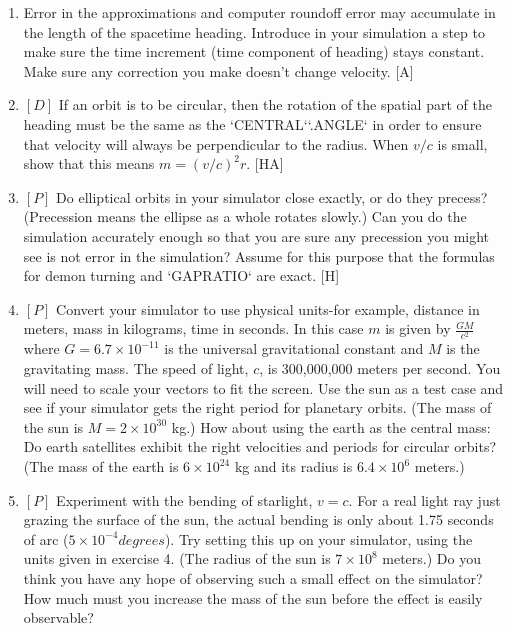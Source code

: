 \documentclass{book}
\begin{document}
\begin{enumerate}
\item Error in the approximations and computer roundoff error may accumulate in the length of the spacetime heading. Introduce in your
simulation a step to make sure the time increment (time component of
heading) stays constant. Make sure any correction you make doesn't
change velocity. [A]

\item $[D]$ If an orbit is to be circular, then the rotation of the spatial part of
the heading must be the same as the \textsc{`CENTRAL`}\textsc{`.ANGLE`} in order to ensure
that velocity will always be perpendicular to the radius. When $v / c$ is
small, show that this means $m = (v/c)^2r$. [HA]

\item $[P]$ Do elliptical orbits in your simulator close exactly, or do they
precess? (Precession means the ellipse as a whole rotates slowly.) Can
you do the simulation accurately enough so that you are sure any precession you might see is not error in the simulation? Assume for this purpose
that the formulas for demon turning and \textsc{`GAPRATIO`} are exact. [H]

\item $[P]$ Convert your simulator to use physical units-for example, distance in meters, mass in kilograms, time in seconds. In this case $m$
is given by $\frac {GM} {c^2}$ where $G = 6.7 \times 10^{-11}$ is the universal gravitational constant and $M$ is the gravitating mass. The speed of light, $c$, is
300,000,000 meters per second. You will need to scale your vectors to fit
the screen. Use the sun as a test case and see if your simulator gets the
right period for planetary orbits. (The mass of the sun is $M = 2 \times 10^{30}$ kg.) How about using the earth as the central mass: Do earth satellites
exhibit the right velocities and periods for circular orbits? (The mass of
the earth is $6 \times 10^{24}$ kg and its radius is $6.4 \times 10^6$ meters.)

\item $[P]$ Experiment with the bending of starlight, $v = c$. For a real light
ray just grazing the surface of the sun, the actual bending is only about
1.75 seconds of arc ($5 \times 10^{-4} degrees$). Try setting this up on your
simulator, using the units given in exercise 4. (The radius of the sun is
$7 \times 10^8$ meters.) Do you think you have any hope of observing such a
small effect on the simulator? How much must you increase the mass of
the sun before the effect is easily observable?


\end{enumerate}
\end{document}
